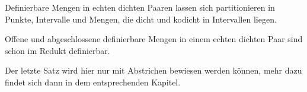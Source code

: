 \begin{satzleer}
	Definierbare Mengen in echten dichten Paaren lassen sich partitionieren in Punkte, Intervalle und Mengen, die dicht und kodicht in Intervallen liegen.
\end{satzleer}

\begin{satzleer}
	Offene und abgeschlossene definierbare Mengen in einem echten dichten Paar sind schon im Redukt definierbar.
\end{satzleer}

Der letzte Satz wird hier nur mit Abstrichen bewiesen werden können, mehr dazu findet sich dann in dem entsprechenden Kapitel.
